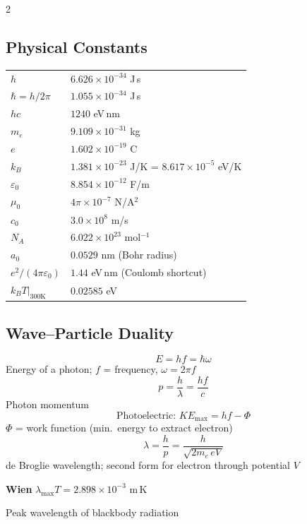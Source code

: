 \documentclass[9pt]{extarticle}
\newcommand{\eqlabel}[1]{\textbf{\scriptsize #1}\;}
\newcommand{\desc}[1]{{\small\color{desc}#1}}
\begin{document}
\begin{multicols}{2}


\subsection{Physical Constants}
\renewcommand{\arraystretch}{1.25}
\begin{tabular}{@{}l@{\;\;}l@{}}
$h$ & $6.626\times10^{-34}$ J\,s \\
$\hbar = h/2\pi$ & $1.055\times10^{-34}$ J\,s \\
$hc$ & $1240$ eV\,nm \\
$m_e$ & $9.109\times10^{-31}$ kg \\
$e$ & $1.602\times10^{-19}$ C \\
$k_B$ & $1.381\times10^{-23}$ J/K = $8.617\times10^{-5}$ eV/K \\
$\varepsilon_0$ & $8.854\times10^{-12}$ F/m \\
$\mu_0$ & $4\pi\times10^{-7}$ N/A$^2$ \\
$c_0$ & $3.0\times10^{8}$ m/s \\
$N_A$ & $6.022\times10^{23}$ mol$^{-1}$ \\
$a_0$ & $0.0529$ nm (Bohr radius) \\
$e^2/(4\pi\varepsilon_0)$ & $1.44$ eV\,nm (Coulomb shortcut) \\
$k_BT|_{300\text{K}}$ & $0.02585$ eV \\
\end{tabular}
\renewcommand{\arraystretch}{1.0}

\subsection{Wave--Particle Duality}
\[E = hf = \hbar\omega\]
\desc{Energy of a photon; $f$ = frequency, $\omega = 2\pi f$}
\[p = \frac{h}{\lambda} = \frac{hf}{c}\]
\desc{Photon momentum}
\[\text{Photoelectric: } KE_{\max} = hf - \Phi\]
\desc{$\Phi$ = work function (min.\ energy to extract electron)}
\[\lambda = \frac{h}{p} = \frac{h}{\sqrt{2m_e\,eV}}\]
\desc{de Broglie wavelength; second form for electron through potential $V$}

\eqlabel{Wien} $\lambda_{\max}T = 2.898\times10^{-3}$ m\,K

\desc{Peak wavelength of blackbody radiation}


\end{multicols}
\end{document}
